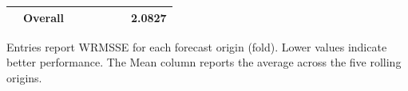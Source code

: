 \begin{table}[H]
\begin{threeparttable}
\begin{tabular}{llccccc|c}
                                   & {\bf Overall} & & & & & & {\bf 2.0827} \\
      \bottomrule
    \end{tabular}
    \begin{tablenotes}
      \footnotesize \item Entries report WRMSSE for each forecast origin (fold). Lower values indicate better performance. The Mean column reports the average across the five rolling origins.
    \end{tablenotes}
  \end{threeparttable}
\end{table}